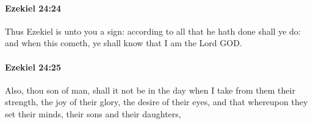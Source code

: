 		\paragraph{Ezekiel 24:24} %
			\label{EZEKIEL-24-24}

			Thus Ezekiel is unto you a sign: according to all that he hath done shall ye do: and when this cometh, ye shall know that I am the Lord GOD.


		\paragraph{Ezekiel 24:25} %
			\label{EZEKIEL-24-25}

			Also, thou son of man, shall it not be in the day when I take from them their strength, the joy of their glory, the desire of their eyes, and that whereupon they set their minds, their sons and their daughters,


